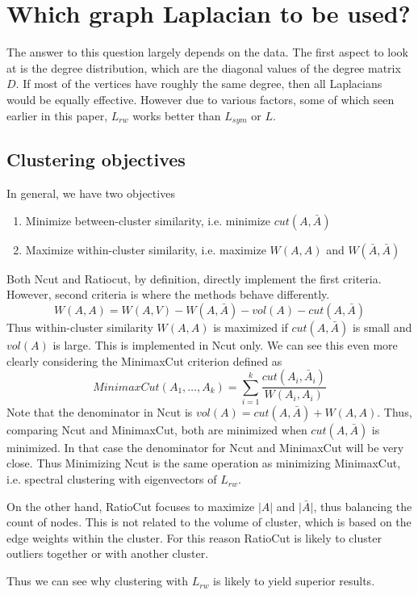 \documentclass[10pt,a4paper, nocenter]{report}
\newcommand{\abs}[1]{\lvert {#1} \rvert}
\begin{document}
	\section{Which graph Laplacian to be used?}
	The answer to this question largely depends on the data. The first aspect to look at is the degree distribution, which are the diagonal values of the degree matrix $D$. If most of the vertices have roughly the same degree, then all Laplacians would be equally effective. However due to various factors, some of which seen earlier in this paper, $L_{rw}$ works better than $L_{sym}$ or $L$.
	\subsection{Clustering objectives}
	In general, we have two objectives
	\begin{enumerate}
		\item Minimize between-cluster similarity, i.e. minimize $cut(A,\bar{A})$
		\item Maximize within-cluster similarity, i.e. maximize $W(A,A)$ and $W(\bar{A}, \bar{A})$
	\end{enumerate}

	Both Ncut and Ratiocut, by definition, directly implement the first criteria. However, second criteria is where the methods behave differently. 
	$$W(A,A) = W(A,V) - W(A,\bar{A}) - vol(A) - cut(A,\bar{A}) $$ 
	Thus within-cluster similarity $W(A,A)$ is maximized if $cut(A,\bar{A})$ is small and $vol(A)$ is large. This is implemented in Ncut only. We can see this even more clearly considering the MinimaxCut criterion defined as $$ MinimaxCut(A_{1},\dots,A_{k}) = \sum_{i=1}^{k}\frac{cut(A_{i},\bar{A}_{i})}{W(A_{i},A_{i})} $$ 
	Note that the denominator in Ncut is $vol(A) = cut(A,\bar{A}) + W(A,A)$. Thus, comparing Ncut and MinimaxCut, both are minimized when $cut(A,\bar{A})$ is minimized. In that case the denominator for Ncut and MinimaxCut will be very close. Thus Minimizing Ncut is the same operation as minimizing MinimaxCut, i.e. spectral clustering with eigenvectors of $L_{rw}$. 
	
	On the other hand, RatioCut focuses to maximize $\abs{A}$ and $\abs{\bar{A}}$, thus balancing the count of nodes. This is not related to the volume of cluster, which is based on the edge weights within the cluster. For this reason RatioCut is likely to cluster outliers together or with another cluster. 
	
	Thus we can see why clustering with $L_{rw}$ is likely to yield superior results. 
	
\end{document}
